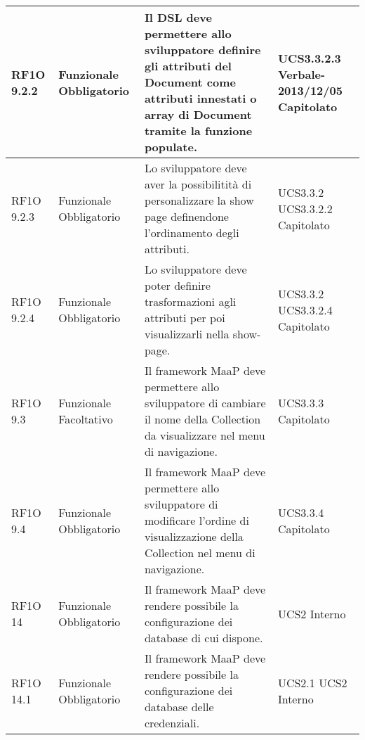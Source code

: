 \begin{center}
\begin{longtable}{ | l | p{2cm} | p{5cm} | p{1.7cm} |}
        RF1O 9.2.2  & Funzionale \newline  Obbligatorio  & Il DSL deve permettere allo sviluppatore definire gli attributi del Document come attributi innestati o array di Document tramite la funzione populate.
 &  UCS3.3.2.3 \newline  Verbale-2013/12/05 \newline  Capitolato \newline  \\ \hline      
        RF1O 9.2.3 & Funzionale \newline  Obbligatorio  & Lo sviluppatore deve aver la possibilitità di personalizzare la show page definendone l'ordinamento degli attributi. &  UCS3.3.2 \newline  UCS3.3.2.2 \newline  Capitolato \newline  \\ \hline      
        RF1O 9.2.4 & Funzionale \newline  Obbligatorio  & Lo sviluppatore deve poter definire trasformazioni agli attributi per poi visualizzarli nella show-page. &  UCS3.3.2 \newline  UCS3.3.2.4 \newline  Capitolato \newline  \\ \hline      
        RF1O 9.3 & Funzionale \newline  Facoltativo  & Il framework MaaP deve permettere allo sviluppatore di cambiare il nome della Collection da visualizzare nel menu di navigazione. &  UCS3.3.3 \newline  Capitolato \newline  \\ \hline      
        RF1O 9.4 & Funzionale \newline  Obbligatorio  & Il framework MaaP deve permettere allo sviluppatore di modificare l'ordine di visualizzazione della Collection nel menu di navigazione. &  UCS3.3.4 \newline  Capitolato \newline  \\ \hline      
        RF1O 14 & Funzionale \newline  Obbligatorio  & Il framework MaaP deve rendere possibile la configurazione dei database di cui dispone. &  UCS2 \newline  Interno \newline  \\ \hline      
        RF1O 14.1 & Funzionale \newline  Obbligatorio  & Il framework MaaP deve rendere possibile la configurazione dei database delle credenziali. &  UCS2.1 \newline  UCS2 \newline  Interno \newline  \\ \hline      

\end{longtable}
\end{center}
